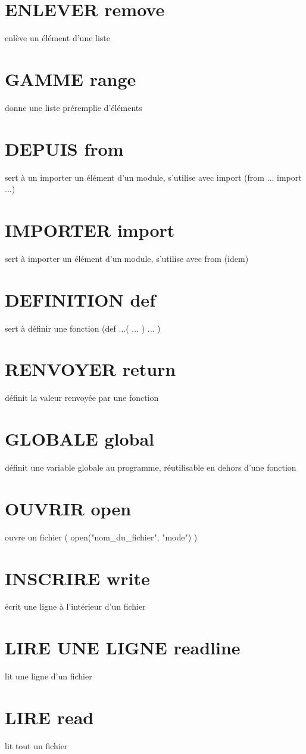 \documentclass{book}
\begin{document}
\section{ENLEVER remove }
  enlève un élément d'une liste
\section{GAMME range }
  donne une liste préremplie d'éléments
\section{DEPUIS from }
  sert à un importer un élément d'un module, s'utilise avec import (from ... import ...)
\section{IMPORTER import }
  sert à importer un élément d'un module, s'utilise avec from (idem)
\section{DEFINITION def }
  sert à définir une fonction (def ...( ... ) { ... })
\section{RENVOYER return }
  définit la valeur renvoyée par une fonction
\section{GLOBALE global }
  définit une variable globale au programme, réutilisable en dehors d'une fonction
\section{OUVRIR open }
  ouvre un fichier ( open("nom\_du\_fichier", "mode") )
\section{INSCRIRE write }
  écrit une ligne à l'intérieur d'un fichier
\section{LIRE UNE LIGNE readline }
  lit une ligne d'un fichier
\section{LIRE read }
  lit tout un fichier
\end{document}
